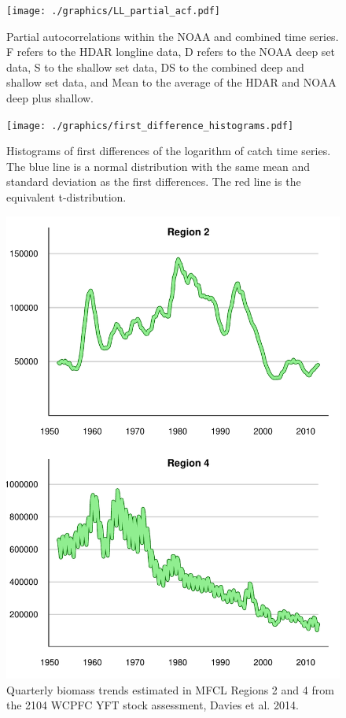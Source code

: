 \documentclass[12pt,letterpaper,twoside]{article}
\begin{document}
\begin{figure}
\begin{center}
\texttt{[image: ./graphics/LL\_partial\_acf.pdf]}
\caption{\label{fig:LLpartialacf}
Partial autocorrelations within the NOAA and combined time
series. F refers to the HDAR longline data, D refers to the NOAA deep
set data, S to the shallow set data,
DS to the combined deep and shallow set data, and Mean to the average
of the HDAR and NOAA deep plus shallow.
}
\end{center}
\end{figure}

\begin{figure}
\begin{center}
\texttt{[image: ./graphics/first\_difference\_histograms.pdf]}
\caption{\label{fig:diff1histo}
Histograms of first differences of the logarithm of catch time series. 
The blue line is
a normal distribution with the same mean and standard deviation as the
first differences. The red line is the equivalent t-distribution.}
\end{center}
\end{figure}

\begin{figure}
\begin{center}
\includegraphics[height=0.8\textheight]{./graphics/MFCL_region_biomass.pdf}
\caption{\label{fig:MFCLregionB}
Quarterly biomass trends estimated in MFCL Regions 2 and 4 from the
2104 WCPFC YFT stock assessment, Davies et al. 2014.
}
\end{center}
\end{figure}
\end{document}
